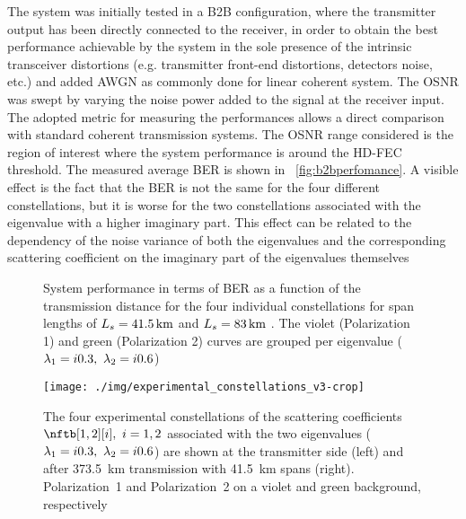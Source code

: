The system was initially tested in a \ac{B2B} configuration, where the transmitter output has been directly connected to the receiver, in order to obtain the best performance achievable by the system in the sole presence of the intrinsic transceiver distortions (e.g. transmitter front-end distortions, detectors noise, etc.) and added \ac{AWGN} as commonly done for linear coherent system. The \ac{OSNR} was swept by varying the noise power added to the signal at the receiver input. The adopted metric for measuring the performances allows a direct comparison with standard coherent transmission systems. The \ac{OSNR} range considered is the region of interest where the system performance is around the \ac{HD-FEC} threshold.  The measured average \ac{BER}
is shown in \figurename~\ref{fig:b2bperfomance}.
A visible effect is the fact that the \ac{BER} is not the same for the four different
constellations, but it is worse for the two constellations associated with
the eigenvalue with a higher imaginary part.
This effect can be related to the dependency of the noise variance of both the eigenvalues and the corresponding scattering coefficient on the imaginary part of the eigenvalues themselves \cite{zhang2015gaussian,zhang2015spectral,Zhang2,hari2016bi,hari2016multieigenvalue}

\begin{figure}[t]
  \centering
  \caption{System performance in terms of \ac{BER} as a function of the transmission distance for the four individual constellations for span lengths of $\spanl=\SI{41.5}{km}$  and $\spanl=\SI{83}{km}$ . The violet (Polarization 1) and green (Polarization 2) curves are grouped per eigenvalue ($\eig[1] = \iunit0.3,~\eig[2] = \iunit0.6$)}
  \label{fig:tx_performance_per_eigenvalue}
\end{figure}

\begin{figure}[p]
  \centering
  \texttt{[image: ./img/experimental\_constellations\_v3-crop]}
  \caption{The four experimental constellations of the scattering coefficients $\nftb[1,2][i],~i=1,2$ associated with the two eigenvalues ($\eig[1] = \iunit0.3,~\eig[2] = \iunit0.6$) are shown at the transmitter side (left) and after \SI{373.5}{\km} transmission with \SI{41.5}{\km} spans (right). Polarization~1 and Polarization~2 on a violet and green background, respectively}
  \label{fig:noisy_constellations}
\end{figure}

